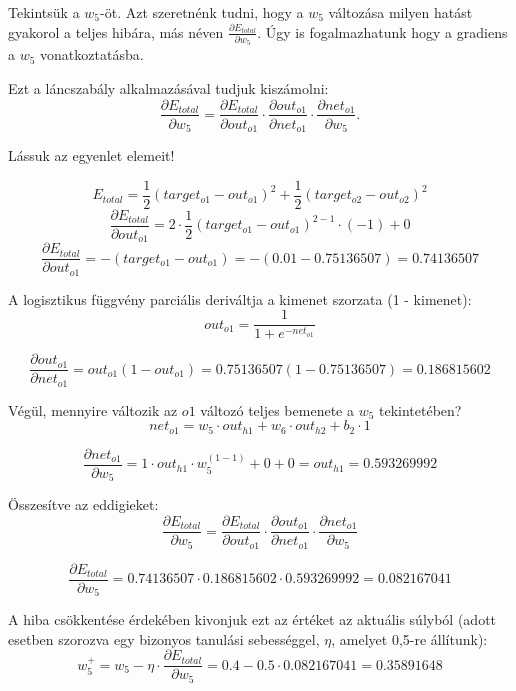 Tekintsük a $w_5$-öt. Azt szeretnénk tudni, hogy a $w_5$ változása milyen hatást gyakorol a teljes hibára, más néven $\frac{\partial E_ {total}}{\partial w_ {5}}$. Úgy is fogalmazhatunk hogy a gradiens a $w_5$ vonatkoztatásba.

Ezt a láncszabály alkalmazásával tudjuk kiszámolni:
$$
\frac{\partial E_{total}}{\partial w_{5}} = \frac{\partial E_{total}}{\partial out_{o1}} \cdot \frac{\partial out_{o1}}{\partial net_{o1}} \cdot \frac{\partial net_{o1}}{\partial w_{5}}.
$$

Lássuk az egyenlet elemeit!
\begin{flushleft}
\begin{equation}
E_{total} = \frac{1}{2}(target_{o1} - out_{o1})^{2} + \frac{1}{2}(target_{o2} - out_{o2})^{2}
\end{equation}
\begin{equation}
\frac{\partial E_{total}}{\partial out_{o1}} = 2 \cdot \frac{1}{2}(target_{o1} - out_{o1})^{2 - 1} \cdot (-1) + 0
\end{equation}
\begin{equation}
\frac{\partial E_{total}}{\partial out_{o1}} = -(target_{o1} - out_{o1}) = -(0.01 - 0.75136507) = 0.74136507
\end{equation}

\end{flushleft}

A logisztikus függvény parciális deriváltja a kimenet szorzata (1 - kimenet):
$$
out_{o1} = \frac{1}{1+e^{-net_{o1}}}
$$

$$
\frac{\partial out_{o1}}{\partial net_{o1}} = out_{o1}(1 - out_{o1}) = 0.75136507(1 - 0.75136507) = 0.186815602
$$

Végül, mennyire változik az $o1$ változó teljes bemenete a $w_5$ tekintetében?
$$
net_{o1} = w_5 \cdot out_{h1} + w_6 \cdot out_{h2} + b_2 \cdot 1
$$

$$
\frac{\partial net_{o1}}{\partial w_{5}} = 1 \cdot out_{h1} \cdot w_5^{(1 - 1)} + 0 + 0 = out_{h1} = 0.593269992
$$

Összesítve az eddigieket:
$$
\frac{\partial E_{total}}{\partial w_{5}} = \frac{\partial E_{total}}{\partial out_{o1}} \cdot \frac{\partial out_{o1}}{\partial net_{o1}} \cdot \frac{\partial net_{o1}}{\partial w_{5}}
$$

$$
\frac{\partial E_{total}}{\partial w_{5}} = 0.74136507 \cdot 0.186815602 \cdot 0.593269992 = 0.082167041
$$

A hiba csökkentése érdekében kivonjuk ezt az értéket az aktuális súlyból (adott esetben szorozva egy bizonyos tanulási sebességgel, $\eta$, amelyet 0,5-re állítunk):
$$
w_5^{+} = w_5 - \eta \cdot \frac{\partial E_{total}}{\partial w_{5}} = 0.4 - 0.5 \cdot 0.082167041 = 0.35891648
$$

